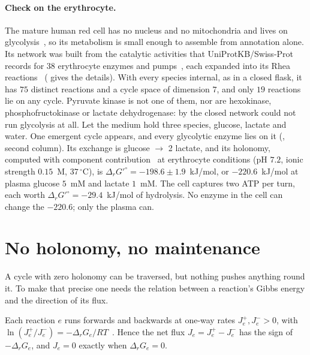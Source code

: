 \paragraph{Check on the erythrocyte.} \lnkC{} The mature human red cell has
no nucleus and no mitochondria and lives on glycolysis~\citep{grace2018}, so
its metabolism is small enough to assemble from annotation alone. Its
network was built from the catalytic activities that UniProtKB/Swiss-Prot
records for $38$ erythrocyte enzymes and pumps~\citep{uniprot2025}, each
expanded into its Rhea reactions~\citep{bansal2022}
( gives the details). With every species internal,
as in a closed flask, it has $75$ distinct reactions and a cycle space of
dimension $7$, and only $19$ reactions lie on any cycle. Pyruvate kinase is
not one of them, nor are hexokinase, phosphofructokinase or lactate
dehydrogenase: by  the closed network could not run
glycolysis at all. Let the medium hold three species, glucose, lactate and
water. One emergent cycle appears, and every glycolytic enzyme lies on it
(, second column). Its exchange is glucose $\to$ 2
lactate, and its holonomy, computed with component
contribution~\citep{beber2022} at erythrocyte conditions (pH $7.2$, ionic
strength $0.15$~M, $37\,^{\circ}$C), is
$\Delta_rG'^{\circ}=-198.6\pm1.9$~kJ/mol, or $-220.6$~kJ/mol at plasma
glucose $5$~mM and lactate $1$~mM. The cell captures two ATP per turn, each
worth $\Delta_rG'^{\circ}=-29.4$~kJ/mol of hydrolysis. No enzyme in the cell
can change the $-220.6$; only the plasma can.

\section{No holonomy, no maintenance}
\label{c1:sec-maintenance}

A cycle with zero holonomy can be traversed, but nothing pushes anything
round it. To make that precise one needs the relation between a reaction's
Gibbs energy and the direction of its flux.

\begin{inputstmt}
\label{c1:in-fluxforce}
\lnkS{} Each reaction $e$ runs forwards and backwards at one-way rates
$J^+_e,J^-_e>0$, with
$\ln(J^+_e/J^-_e)=-\Delta_rG_e/RT$~\citep{beardqian2007}. Hence the net flux
$J_e=J^+_e-J^-_e$ has the sign of $-\Delta_rG_e$, and $J_e=0$ exactly when
$\Delta_rG_e=0$.
\end{inputstmt}

